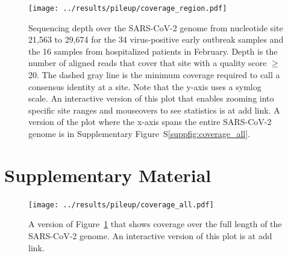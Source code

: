 \documentclass[9pt,twocolumn,twoside]{gsajnl_modified}
\begin{document}
\begin{figure}[]
\centering
\texttt{[image: ../results/pileup/coverage\_region.pdf]}
\caption{Sequencing depth over the SARS-CoV-2 genome from nucleotide site 21,563 to 29,674 for the 34 virus-positive early outbreak samples and the 16 samples from hospitalized patients in February.
Depth is the number of aligned reads that cover that site with a quality score $\ge$20.
The dashed gray line is the minimum coverage required to call a consensus identity at a site.
Note that the y-axis uses a symlog scale.
An interactive version of this plot that enables zooming into specific site ranges and mouseovers to see statistics is at {\color{red} add link}.
A version of the plot where the x-axis spans the entire SARS-CoV-2 genome is in Supplementary Figure~S\ref{suppfig:coverage_all}.
}
\label{fig:coverage}
\end{figure}



\clearpage
\onecolumn
\renewcommand{\thepage}{S\arabic{page}}
\setcounter{page}{1}

\section{Supplementary Material}

\begin{figure}[h!]
\centering
\texttt{[image: ../results/pileup/coverage\_all.pdf]}
\caption{A version of Figure~\ref{fig:coverage} that shows coverage over the full length of the SARS-CoV-2 genome.
An interactive version of this plot is at {\color{red} add link}.
}
\label{suppfigfig:coverage_all}
\end{figure}
\end{document}
